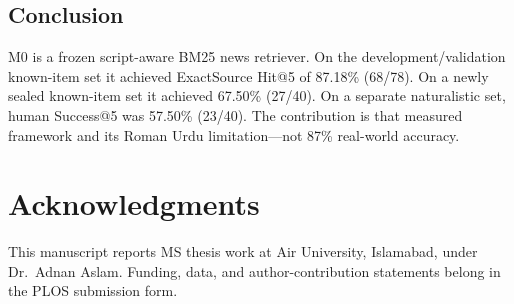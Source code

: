 \documentclass[10pt,letterpaper]{article}
\begin{document}
\subsection*{Conclusion}

M0 is a frozen script-aware BM25 news retriever. On the development/validation known-item set it achieved ExactSource Hit@5 of 87.18\% (68/78). On a newly sealed known-item set it achieved 67.50\% (27/40). On a separate naturalistic set, human Success@5 was 57.50\% (23/40). The contribution is that measured framework and its Roman Urdu limitation---not 87\% real-world accuracy.

\section*{Acknowledgments}

This manuscript reports MS thesis work at Air University, Islamabad, under Dr.\ Adnan Aslam. Funding, data, and author-contribution statements belong in the PLOS submission form.

\nolinenumbers

\end{document}
